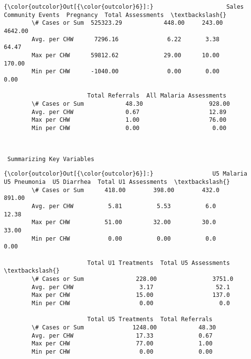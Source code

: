 \documentclass[11pt]{article}
\begin{document}
\begin{Verbatim}[commandchars=\\\{\}]
{\color{outcolor}Out[{\color{outcolor}6}]:}                     Sales  Community Events  Pregnancy  Total Assessments  \textbackslash{}
        \# Cases or Sum  525323.29            448.00     243.00            4642.00   
        Avg. per CHW      7296.16              6.22       3.38              64.47   
        Max per CHW      59812.62             29.00      10.00             170.00   
        Min per CHW      -1040.00              0.00       0.00               0.00   
        
                        Total Referrals  All Malaria Assessments  
        \# Cases or Sum            48.30                   928.00  
        Avg. per CHW               0.67                    12.89  
        Max per CHW                1.00                    76.00  
        Min per CHW                0.00                     0.00  
\end{Verbatim}
            
    \begin{Verbatim}[commandchars=\\\{\}]


 Summarizing Key Variables 

    \end{Verbatim}

\begin{Verbatim}[commandchars=\\\{\}]
{\color{outcolor}Out[{\color{outcolor}6}]:}                 U5 Malaria  U5 Pneumonia  U5 Diarrhea  Total U1 Assessments  \textbackslash{}
        \# Cases or Sum      418.00        398.00        432.0                891.00   
        Avg. per CHW          5.81          5.53          6.0                 12.38   
        Max per CHW          51.00         32.00         30.0                 33.00   
        Min per CHW           0.00          0.00          0.0                  0.00   
        
                        Total U1 Treatments  Total U5 Assessments  \textbackslash{}
        \# Cases or Sum               228.00                3751.0   
        Avg. per CHW                   3.17                  52.1   
        Max per CHW                   15.00                 137.0   
        Min per CHW                    0.00                   0.0   
        
                        Total U5 Treatments  Total Referrals  
        \# Cases or Sum              1248.00            48.30  
        Avg. per CHW                  17.33             0.67  
        Max per CHW                   77.00             1.00  
        Min per CHW                    0.00             0.00  
\end{Verbatim}
            
\end{document}
